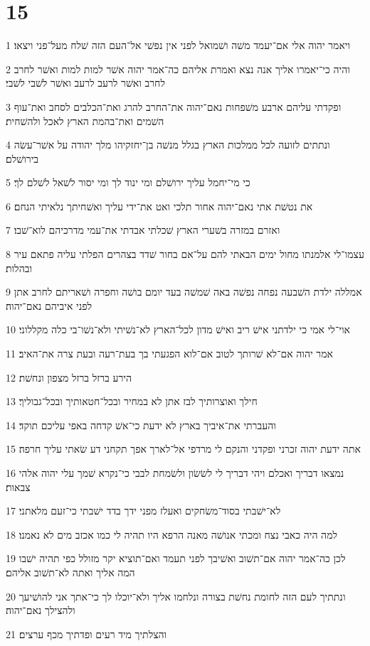 \chapter{15}

\par 1 ויאמר יהוה אלי אם־יעמד משׁה ושׁמואל לפני אין נפשׁי אל־העם הזה שׁלח מעל־פני ויצאו׃
\par 2 והיה כי־יאמרו אליך אנה נצא ואמרת אליהם כה־אמר יהוה אשׁר למות למות ואשׁר לחרב לחרב ואשׁר לרעב לרעב ואשׁר לשׁבי לשׁבי׃
\par 3 ופקדתי עליהם ארבע משׁפחות נאם־יהוה את־החרב להרג ואת־הכלבים לסחב ואת־עוף השׁמים ואת־בהמת הארץ לאכל ולהשׁחית׃
\par 4 ונתתים לזועה לכל ממלכות הארץ בגלל מנשׁה בן־יחזקיהו מלך יהודה על אשׁר־עשׂה בירושׁלם׃
\par 5 כי מי־יחמל עליך ירושׁלם ומי ינוד לך ומי יסור לשׁאל לשׁלם לך׃
\par 6 את נטשׁת אתי נאם־יהוה אחור תלכי ואט את־ידי עליך ואשׁחיתך נלאיתי הנחם׃
\par 7 ואזרם במזרה בשׁערי הארץ שׁכלתי אבדתי את־עמי מדרכיהם לוא־שׁבו׃
\par 8 עצמו־לי אלמנתו מחול ימים הבאתי להם על־אם בחור שׁדד בצהרים הפלתי עליה פתאם עיר ובהלות׃
\par 9 אמללה ילדת השׁבעה נפחה נפשׁה באה שׁמשׁה בעד יומם בושׁה וחפרה ושׁאריתם לחרב אתן לפני איביהם נאם־יהוה׃
\par 10 אוי־לי אמי כי ילדתני אישׁ ריב ואישׁ מדון לכל־הארץ לא־נשׁיתי ולא־נשׁו־בי כלה מקללוני׃
\par 11 אמר יהוה אם־לא שׁרותך לטוב אם־לוא הפגעתי בך בעת־רעה ובעת צרה את־האיב׃
\par 12 הירע ברזל ברזל מצפון ונחשׁת׃
\par 13 חילך ואוצרותיך לבז אתן לא במחיר ובכל־חטאותיך ובכל־גבוליך׃
\par 14 והעברתי את־איביך בארץ לא ידעת כי־אשׁ קדחה באפי עליכם תוקד׃
\par 15 אתה ידעת יהוה זכרני ופקדני והנקם לי מרדפי אל־לארך אפך תקחני דע שׂאתי עליך חרפה׃
\par 16 נמצאו דבריך ואכלם ויהי דבריך לי לשׂשׂון ולשׂמחת לבבי כי־נקרא שׁמך עלי יהוה אלהי צבאות׃
\par 17 לא־ישׁבתי בסוד־משׂחקים ואעלז מפני ידך בדד ישׁבתי כי־זעם מלאתני׃
\par 18 למה היה כאבי נצח ומכתי אנושׁה מאנה הרפא היו תהיה לי כמו אכזב מים לא נאמנו׃
\par 19 לכן כה־אמר יהוה אם־תשׁוב ואשׁיבך לפני תעמד ואם־תוציא יקר מזולל כפי תהיה ישׁבו המה אליך ואתה לא־תשׁוב אליהם׃
\par 20 ונתתיך לעם הזה לחומת נחשׁת בצורה ונלחמו אליך ולא־יוכלו לך כי־אתך אני להושׁיעך ולהצילך נאם־יהוה׃
\par 21 והצלתיך מיד רעים ופדתיך מכף ערצים׃


